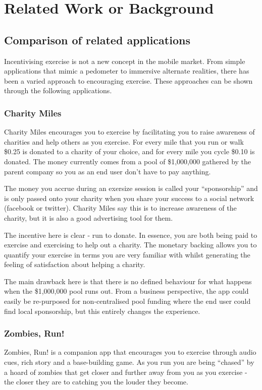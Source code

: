 \chapter{Related Work or Background}\label{ch_background}

\section{Comparison of related applications}\label{sec_comparison}
Incentivising exercise is not a new concept in the mobile market. From
simple applications that mimic a pedometer to immersive alternate
realities, there has been a varied approach to encouraging
exercise. These approaches can be shown through the following
applications.

\subsection{Charity Miles}
Charity Miles encourages you to exercise by facilitating you to raise
awareness of charities and help
others as you exercise. For every mile that you run or walk \$0.25 is
donated to a charity of your choice, and for every mile you cycle \$0.10
is donated. The money currently comes from a pool of \$1,000,000
gathered by the parent company so you as an end user don't have to pay
anything. 

The money you accrue during an exersize session is called your
``sponsorship'' and is only passed onto your charity when you share
your success to a social network (facebook or
twitter)\cite{charitymiles_terms}. Charity Miles say this is to
increase awareness of the charity, but it is also a good advertising
tool for them.

The incentive here is clear - run to donate. In essence, you are both
being paid to exercise and exercising to help out a charity. The
monetary backing allows you to quantify your exercise in terms you are
very familiar with whilst generating the feeling of satisfaction about
helping a charity.

The main drawback here is that there is no defined behaviour for what
happens when the \$1,000,000 pool runs out. From a business
perspective, the app could easily be re-purposed for non-centralised
pool funding where the end user could find local sponsorship, but this
entirely changes the experience.

\subsection{Zombies, Run!}
Zombies, Run! is a companion app that encourages you to exercise through
audio cues, rich story and a base-building game. As you run you are
being ``chased'' by a hoard of zombies that get closer and further
away from you as you exercise - the closer they are to catching you
the louder they become. 

